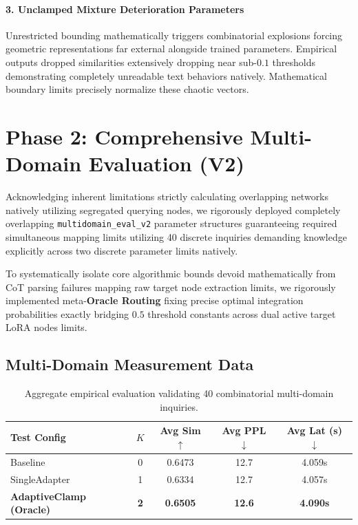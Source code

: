 \documentclass[11pt]{article}
\begin{document}
\paragraph{3. Unclamped Mixture Deterioration Parameters}
Unrestricted bounding mathematically triggers combinatorial explosions forcing geometric representations far external alongside trained parameters. Empirical outputs dropped similarities extensively dropping near sub-$0.1$ thresholds demonstrating completely unreadable text behaviors natively. Mathematical boundary limits precisely normalize these chaotic vectors.

\section{Phase 2: Comprehensive Multi-Domain Evaluation (V2)}

Acknowledging inherent limitations strictly calculating overlapping networks natively utilizing segregated querying nodes, we rigorously deployed completely overlapping \texttt{multidomain\_eval\_v2} parameter structures guaranteeing required simultaneous mapping limits utilizing 40 discrete inquiries demanding knowledge explicitly across two discrete parameter limits natively.

To systematically isolate core algorithmic bounds devoid mathematically from CoT parsing failures mapping raw target node extraction limits, we rigorously implemented meta-\textbf{Oracle Routing} fixing precise optimal integration probabilities exactly bridging $0.5$ threshold constants across dual active target LoRA nodes limits.

\subsection{Multi-Domain Measurement Data}

\begin{table}[H]
\centering
\begin{tabular}{lcccc}
\toprule
\textbf{Test Config} & \textbf{$K$} & \textbf{Avg Sim $\uparrow$} & \textbf{Avg PPL $\downarrow$} & \textbf{Avg Lat (s) $\downarrow$} \\
\midrule
Baseline & 0 & 0.6473 & 12.7 & 4.059s \\
SingleAdapter & 1 & 0.6334 & 12.7 & 4.057s \\
\textbf{AdaptiveClamp (Oracle)} & \textbf{2} & \textbf{0.6505} & \textbf{12.6} & \textbf{4.090s} \\
\bottomrule
\end{tabular}
\caption{Aggregate empirical evaluation validating 40 combinatorial multi-domain inquiries.}
\end{table}
\end{document}
